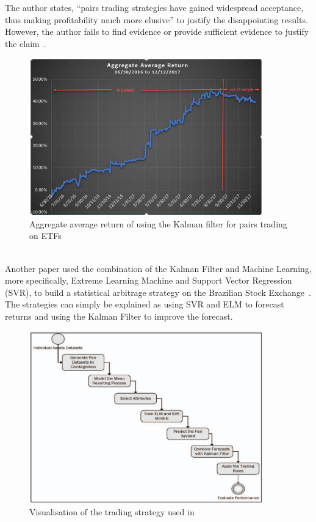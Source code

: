 \noindent The author states, ``pairs trading strategies have gained widespread acceptance, thus making profitability much more elusive'' to justify the disappointing results. However, the author fails to find evidence or provide sufficient evidence to justify the claim~\cite{dempsey_market_2017}.
\begin{figure}[htb!]
    \centering
    \includegraphics[width=0.9\textwidth]{background/Images/insamplevsoutsampleresults.png}
    \caption{Aggregate average return of using the Kalman filter for pairs trading on ETFs~\cite{dempsey_market_2017}}
    \label{fig:kalman_results}
\end{figure}
\\[3mm]
Another paper used the combination of the Kalman Filter and Machine Learning, more specifically, Extreme Learning Machine and Support Vector Regression (SVR), to build a statistical arbitrage strategy on the Brazilian Stock Exchange~\cite{6974093}. The strategies can simply be explained as using SVR and ELM to forecast returns and using the Kalman Filter to improve the forecast.
\begin{figure}[htb!]
    \centering
    \includegraphics[width=0.9\textwidth]{background/Images/KalmanMLFlowChart.png}
    \caption{Visualisation of the trading strategy used in \cite{6974093}}
    \label{fig:kalman_ml_flowchart}
\end{figure}
